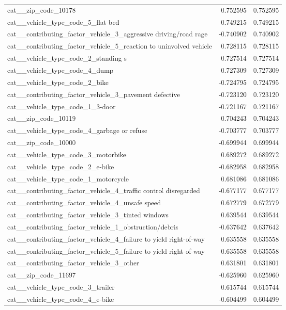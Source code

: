 \begin{tabular}{lrr}
cat__zip_code_10178 & 0.752595 & 0.752595 \\
cat__vehicle_type_code_5_flat bed & 0.749215 & 0.749215 \\
cat__contributing_factor_vehicle_3_aggressive driving/road rage & -0.740902 & 0.740902 \\
cat__contributing_factor_vehicle_5_reaction to uninvolved vehicle & 0.728115 & 0.728115 \\
cat__vehicle_type_code_2_standing s & 0.727514 & 0.727514 \\
cat__vehicle_type_code_4_dump & 0.727309 & 0.727309 \\
cat__vehicle_type_code_2_bike & -0.724795 & 0.724795 \\
cat__contributing_factor_vehicle_3_pavement defective & -0.723120 & 0.723120 \\
cat__vehicle_type_code_1_3-door & -0.721167 & 0.721167 \\
cat__zip_code_10119 & 0.704243 & 0.704243 \\
cat__vehicle_type_code_4_garbage or refuse & -0.703777 & 0.703777 \\
cat__zip_code_10000 & -0.699944 & 0.699944 \\
cat__vehicle_type_code_3_motorbike & 0.689272 & 0.689272 \\
cat__vehicle_type_code_2_e-bike & -0.682958 & 0.682958 \\
cat__vehicle_type_code_1_motorcycle & 0.681086 & 0.681086 \\
cat__contributing_factor_vehicle_4_traffic control disregarded & -0.677177 & 0.677177 \\
cat__contributing_factor_vehicle_4_unsafe speed & 0.672779 & 0.672779 \\
cat__contributing_factor_vehicle_3_tinted windows & 0.639544 & 0.639544 \\
cat__contributing_factor_vehicle_1_obstruction/debris & -0.637642 & 0.637642 \\
cat__contributing_factor_vehicle_4_failure to yield right-of-way & 0.635558 & 0.635558 \\
cat__contributing_factor_vehicle_5_failure to yield right-of-way & 0.635558 & 0.635558 \\
cat__contributing_factor_vehicle_3_other & 0.631801 & 0.631801 \\
cat__zip_code_11697 & -0.625960 & 0.625960 \\
cat__vehicle_type_code_3_trailer & 0.615744 & 0.615744 \\
cat__vehicle_type_code_4_e-bike & -0.604499 & 0.604499 \\

\end{tabular}
